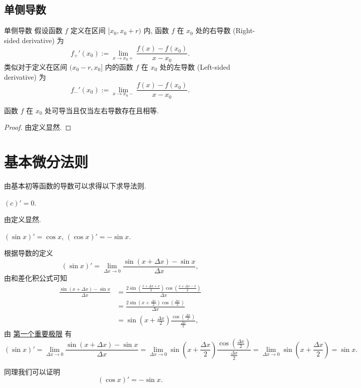 \documentclass[cn,toc=twocol]{elegantbook}
\begin{document}
\subsection{单侧导数}

\begin{definition}{单侧导数}
	假设函数 $f$	定义在区间 $[x_0,x_0+r)$ 内, 函数 $f$ 在 $x_0$ 处的右导数 (Right-sided derivative) 为
	\[
		f_+' (x_0) := \lim_{x \to x_0+} \frac{f(x) - f(x_0)}{x - x_0}.
	\]
	类似对于定义在区间 $(x_0 - r,x_0]$ 内的函数 $f$ 在 $x_0$ 处的左导数 (Left-sided derivative) 为
	\[
		f_-' (x_0) := \lim_{x \to x_0-} \frac{f(x) - f(x_0)}{x - x_0}.
	\]
\end{definition}

\begin{theorem}
	函数 $f$ 在 $x_0$ 处可导当且仅当左右导数存在且相等.	
\end{theorem}
\begin{proof}
	由定义显然.
\end{proof}

\section{基本微分法则}

由基本初等函数的导数可以求得以下求导法则.
\begin{example}
	$(c)' = 0$.
\end{example}
\begin{solution}
	由定义显然.
\end{solution}

\vspace{0.8em}

\begin{example}
	$(\sin x)' = \cos x$, $(\cos x)' = -\sin x$.
\end{example}
\begin{solution}
	根据导数的定义
	\[
		(\sin x)' = \lim_{\Delta x \to 0}\frac{\sin (x + \Delta x) - \sin x}{\Delta x},
	\]
	由和差化积公式可知
	\[
	\begin{aligned}
		\frac{\sin (x + \Delta x) - \sin x}{\Delta x} &= \frac{2\sin\left(\frac{x + \Delta x + x}{2}\right)\cos \left(\frac{x + \Delta x - x}{2}\right)}{\Delta x}\\
		&= \frac{2\sin\left(x + \frac{\Delta x}{2}\right)\cos \left(\frac{\Delta x}{2}\right)}{\Delta x}\\
		&= \sin\left(x + \frac{\Delta x}{2}\right) \frac{\cos \left(\frac{\Delta x}{2}\right)}{\frac{\Delta x}{2}},
	\end{aligned}
	\]
	由 \hyperref[thm:Ilimit1]{第一个重要极限} 有
	\[
		(\sin x)' = \lim_{\Delta x \to 0}\frac{\sin (x + \Delta x) - \sin x}{\Delta x} = \lim_{\Delta x \to 0}\sin\left(x + \frac{\Delta x}{2}\right) \frac{\cos \left(\frac{\Delta x}{2}\right)}{\frac{\Delta x}{2}} = \lim_{\Delta x \to 0} \sin\left(x + \frac{\Delta x}{2}\right)= \sin x.
	\]
	
	同理我们可以证明
	\[
		(\cos x)' = -\sin x.
	\]
\end{solution}
\end{document}
